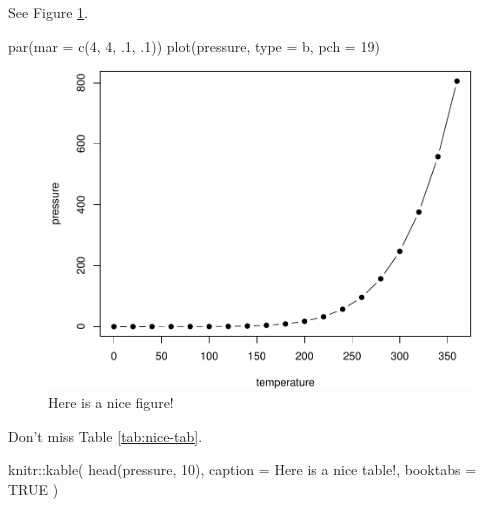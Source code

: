 \documentclass[
]{book}
\newenvironment{Shaded}{\begin{snugshade}}{\end{snugshade}}
\newcommand{\AttributeTok}[1]{\textcolor[rgb]{0.77,0.63,0.00}{#1}}
\newcommand{\ConstantTok}[1]{\textcolor[rgb]{0.00,0.00,0.00}{#1}}
\newcommand{\DecValTok}[1]{\textcolor[rgb]{0.00,0.00,0.81}{#1}}
\newcommand{\FunctionTok}[1]{\textcolor[rgb]{0.00,0.00,0.00}{#1}}
\newcommand{\NormalTok}[1]{#1}
\newcommand{\SpecialCharTok}[1]{\textcolor[rgb]{0.00,0.00,0.00}{#1}}
\newcommand{\StringTok}[1]{\textcolor[rgb]{0.31,0.60,0.02}{#1}}
\theoremstyle{definition}
\theoremstyle{definition}
\theoremstyle{definition}
\theoremstyle{definition}
\theoremstyle{remark}
\begin{document}
See Figure \ref{fig:nice-fig}.

\begin{Shaded}
\begin{Highlighting}[]
\FunctionTok{par}\NormalTok{(}\AttributeTok{mar =} \FunctionTok{c}\NormalTok{(}\DecValTok{4}\NormalTok{, }\DecValTok{4}\NormalTok{, .}\DecValTok{1}\NormalTok{, .}\DecValTok{1}\NormalTok{))}
\FunctionTok{plot}\NormalTok{(pressure, }\AttributeTok{type =} \StringTok{\textquotesingle{}b\textquotesingle{}}\NormalTok{, }\AttributeTok{pch =} \DecValTok{19}\NormalTok{)}
\end{Highlighting}
\end{Shaded}

\begin{figure}

{\centering \includegraphics[width=0.8\linewidth]{_main_files/figure-latex/nice-fig-1} 

}

\caption{Here is a nice figure!}\label{fig:nice-fig}
\end{figure}

Don't miss Table \ref{tab:nice-tab}.

\begin{Shaded}
\begin{Highlighting}[]
\NormalTok{knitr}\SpecialCharTok{::}\FunctionTok{kable}\NormalTok{(}
  \FunctionTok{head}\NormalTok{(pressure, }\DecValTok{10}\NormalTok{), }\AttributeTok{caption =} \StringTok{\textquotesingle{}Here is a nice table!\textquotesingle{}}\NormalTok{,}
  \AttributeTok{booktabs =} \ConstantTok{TRUE}
\NormalTok{)}
\end{Highlighting}
\end{Shaded}
\end{document}
